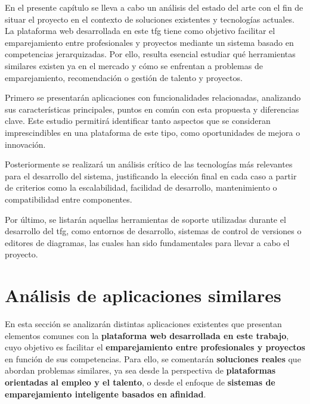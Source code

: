 
En el presente capítulo se lleva a cabo un análisis del estado del arte con el fin de situar el 
proyecto en el contexto de soluciones existentes y tecnologías actuales. La plataforma 
web desarrollada en este \gls{tfg} tiene como objetivo facilitar el emparejamiento entre 
profesionales y proyectos mediante un sistema basado en competencias jerarquizadas. 
Por ello, resulta esencial estudiar qué herramientas similares existen ya en el mercado 
y cómo se enfrentan a problemas de emparejamiento, recomendación o gestión de 
talento y proyectos.

Primero se presentarán aplicaciones con funcionalidades relacionadas, analizando sus 
características principales, puntos en común con esta propuesta y diferencias clave. 
Este estudio permitirá identificar tanto aspectos que se consideran imprescindibles en 
una plataforma de este tipo, como oportunidades de mejora o innovación.

Posteriormente se realizará un análisis crítico de las tecnologías más relevantes para el 
desarrollo del sistema, justificando la elección final en cada caso a partir de criterios 
como la escalabilidad, facilidad de desarrollo, mantenimiento o compatibilidad entre 
componentes.

Por último, se listarán aquellas herramientas de soporte utilizadas durante el desarrollo 
del \gls{tfg}, como entornos de desarrollo, sistemas de control de versiones o editores 
de diagramas, las cuales han sido fundamentales para llevar a cabo el proyecto.

\section{Análisis de aplicaciones similares}
En esta sección se analizarán distintas aplicaciones existentes que presentan elementos 
comunes con la \textbf{plataforma web desarrollada en este trabajo}, cuyo objetivo es 
facilitar el \textbf{emparejamiento entre profesionales y proyectos} en función de sus 
competencias. Para ello, se comentarán \textbf{soluciones reales} que abordan problemas 
similares, ya sea desde la perspectiva de \textbf{plataformas orientadas al empleo y el talento}, 
o desde el enfoque de \textbf{sistemas de emparejamiento inteligente basados en afinidad}.

